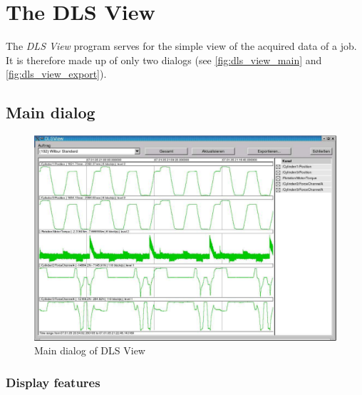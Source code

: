 \documentclass[a4paper,12pt,BCOR6mm,bibtotoc,idxtotoc]{scrbook}
\begin{document}

\chapter{The DLS View} \label{sec:view} 

The \textit{DLS View} program serves for the simple view of the acquired data
of a job. It is therefore made up of only two dialogs (see
\autoref{fig:dls_view_main} and \autoref{fig:dls_view_export}).


\section{Main dialog} \label{sec:view_main}

\begin{figure}[tbh] \begin{center} \includegraphics[width=\textwidth]{bilder/view_normal} \end{center} \caption{Main dialog of DLS View} \label{fig:dls_view_main} \end{figure}


\subsection{Display features}
\end{document}

